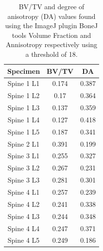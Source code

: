 \begin{table}[ht!]
	\caption{BV/TV and degree of anisotropy (DA) values found using the ImageJ
    plugin BoneJ tools Volume Fraction and Annisotropy respectively using a
    threshold of 18.}
	\label{tab:bv_tv_anis}
	\centering
	\begin{tabular}{c|c|c}
    Specimen                       & BV/TV & DA\\ \hline \hline
    Spine 1 L1  & 0.174 & 0.387 \\
    Spine 1 L2  & 0.17  & 0.364\\
    Spine 1 L3  & 0.137 & 0.359\\
    Spine 1 L4  & 0.127 & 0.418\\
    Spine 1 L5  & 0.187 & 0.341\\
    Spine 2 L1  & 0.391 & 0.199\\
    Spine 3 L1  & 0.255 & 0.327\\
    Spine 3 L2  & 0.267 & 0.231\\
    Spine 3 L3  & 0.281 & 0.301\\
    Spine 4 L1  & 0.257 & 0.239\\
    Spine 4 L2  & 0.241 & 0.338\\
    Spine 4 L3  & 0.244 & 0.348\\
    Spine 4 L4  & 0.247 & 0.371\\
    Spine 4 L5  & 0.249 & 0.186\\
    \hline
	\end{tabular}
\end{table}

